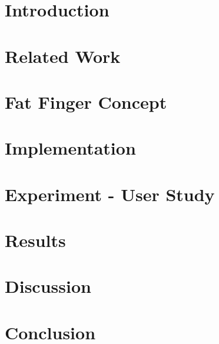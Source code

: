 \documentclass[10pt,twoside]{report}
\begin{document}
\tableofcontents
\cleardoublepage

\listoffigures
\cleardoublepage

\listoftables
\cleardoublepage


\pagestyle{fancy}

\chapter{Introduction}
\label{sec:Introduction}

\cleardoublepage

\chapter{Related Work}
\label{sec:RelatedWork}

\cleardoublepage

\chapter{Fat Finger Concept}
\label{sec:FatFingerConcept}

\cleardoublepage

\chapter{Implementation}
\label{sec:Implementation}

\cleardoublepage

\chapter{Experiment - User Study}
\label{sec:Experiment}

\cleardoublepage


\chapter{Results}
\label{sec:Results}

\cleardoublepage


\chapter{Discussion}
\label{sec:Discussion}

\cleardoublepage

\chapter{Conclusion}

\cleardoublepage


\cleardoublepage

\appendix

\end{document}

